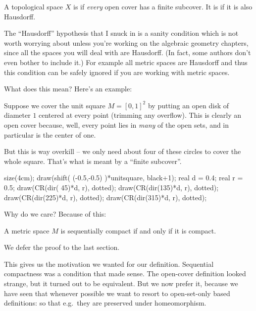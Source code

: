\begin{definition}
	A topological space $X$ is 
	if \emph{every} open cover has a finite subcover.
	It is  if it is also Hausdorff.
\end{definition}
\begin{remark}
	The ``Hausdorff'' hypothesis that I snuck in
	is a sanity condition which is not worth worrying about unless you're
	working on the algebraic geometry chapters,
	since all the spaces you will deal with are Hausdorff.
	(In fact, some authors don't even bother to include it.)
	For example all metric spaces are Hausdorff
	and thus this condition can be safely ignored
	if you are working with metric spaces.
\end{remark}
What does this mean? Here's an example:
\begin{example}
	Suppose we cover the unit square $M = [0,1]^2$ by
	putting an open disk of diameter $1$ centered at every point
	(trimming any overflow).
	This is clearly an open cover because,
	well, every point lies in \emph{many} of the open sets,
	and in particular is the center of one.

	But this is way overkill -- we only need about four
	of these circles to cover the whole square.
	That's what is meant by a ``finite subcover''.
	\begin{center}
		\begin{asy}
			size(4cm);
			draw(shift( (-0.5,-0.5) )*unitsquare, black+1);
			real d = 0.4;
			real r = 0.5;
			draw(CR(dir( 45)*d, r), dotted);
			draw(CR(dir(135)*d, r), dotted);
			draw(CR(dir(225)*d, r), dotted);
			draw(CR(dir(315)*d, r), dotted);
		\end{asy}
	\end{center}
\end{example}

Why do we care?
Because of this:
\begin{theorem}
	A metric space $M$ is sequentially compact if and only if it is compact.
	\label{thm:compactness_metric}
\end{theorem}
We defer the proof to the last section.

This gives us the motivation we wanted for our definition.
Sequential compactness was a condition that made sense.
The open-cover definition looked strange,
but it turned out to be equivalent.
But we now prefer it, because we have seen that
whenever possible we want to resort to open-set-only based definitions:
so that e.g.\ they are preserved under homeomorphism.

